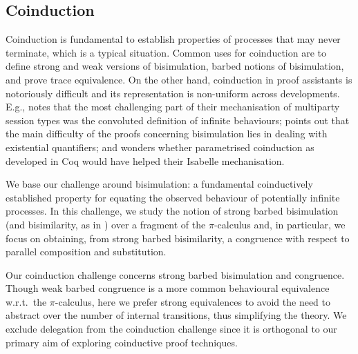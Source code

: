 \documentclass[runningheads]{llncs}
\begin{document}


\subsection{Coinduction}
Coinduction is fundamental to establish properties of processes that
may never terminate, which is a typical situation.
Common uses for coinduction are to define strong and weak versions of
bisimulation, barbed notions of bisimulation, and prove trace equivalence.
On the other hand, coinduction in proof assistants
is notoriously difficult and its representation
is non-uniform across developments.
E.g., \cite{Castro-Perez2021} notes that the most challenging
part of their mechanisation of multiparty session types
was the convoluted definition of infinite behaviours;
\cite{Pohjola2022} points out that the main difficulty
of the proofs concerning bisimulation lies
in dealing with existential quantifiers; and
\cite{Bengtson2016} wonders whether parametrised
coinduction as developed in Coq \cite{Hur2013} would
have helped their Isabelle mechanisation.


We base our challenge around bisimulation: a fundamental coinductively
established property for equating the
observed behaviour of potentially infinite processes. 
In this challenge, we study the notion of strong barbed bisimulation
(and bisimilarity, as in \cite{picalcbook})
over a fragment of the $\pi$-calculus and,
in particular, we focus on obtaining,
from strong barbed bisimilarity,
a congruence with respect to
parallel composition and substitution.


Our coinduction challenge concerns strong barbed bisimulation and
congruence.%
Though weak barbed congruence is a more common behavioural equivalence
w.r.t.\ the \(\pi\)-calculus, here we prefer strong equivalences to avoid the
need to abstract over the number of internal transitions, thus
simplifying the theory.  We exclude delegation from the coinduction
challenge since it is orthogonal to our primary aim of exploring
coinductive proof techniques.
\end{document}
